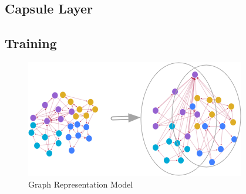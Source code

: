 \subsection{Capsule Layer}

\FloatBarrier
\subsection{Training}

\begin{figure}[!htbp]
  \centering
  \includegraphics[width=\linewidth,height=\textheight,keepaspectratio]{images/graph_normalization}
  \caption{Graph Representation Model}
  \label{graph_model}
\end{figure}
